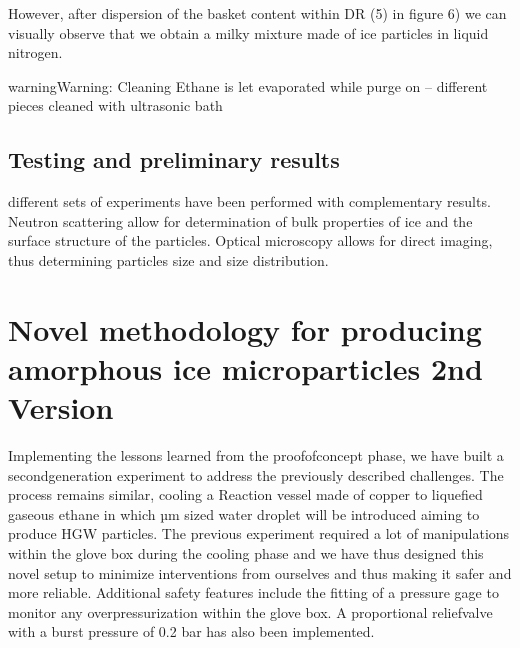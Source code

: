 \documentclass[letterpaper,10pt,english]{jupyterBook}
\begin{document}
\sphinxAtStartPar
However, after dispersion of the basket content within DR (5) in figure 6) we can visually observe that we obtain a milky mixture made of ice particles in liquid nitrogen.

\begin{sphinxadmonition}{warning}{Warning:}
\sphinxAtStartPar
Cleaning \sphinxhyphen{} Ethane is let evaporated while purge on – different pieces cleaned with ultrasonic bath
\end{sphinxadmonition}


\section{Testing and preliminary results}
\label{\detokenize{Chapter6/Chapter6:testing-and-preliminary-results}}
 different sets of experiments have been performed with complementary results. Neutron scattering allow for determination of bulk properties of ice and the surface structure of the particles. Optical microscopy allows for direct imaging, thus determining particles size and size distribution.

\sphinxstepscope


\chapter{Novel methodology for producing amorphous ice micro\sphinxhyphen{}particles \sphinxhyphen{} 2nd Version}
\label{\detokenize{Chapter7/Chapter7:novel-methodology-for-producing-amorphous-ice-micro-particles-2nd-version}}\label{\detokenize{Chapter7/Chapter7::doc}}
\sphinxAtStartPar
Implementing the lessons learned from the proof\sphinxhyphen{}of\sphinxhyphen{}concept phase, we have built a second\sphinxhyphen{}generation experiment to address the previously described challenges. The process remains similar, cooling a Reaction vessel made of copper to liquefied gaseous ethane in which µm sized water droplet will be introduced aiming to produce HGW particles. The previous experiment required a lot of manipulations within the glove box during the cooling phase and we have thus designed this novel setup to minimize interventions from ourselves and thus making it safer and more reliable. Additional safety features include the fitting of a pressure gage to monitor any over\sphinxhyphen{}pressurization within the glove box. A proportional relief\sphinxhyphen{}valve with a burst pressure of 0.2 bar has also been implemented.
\end{document}
